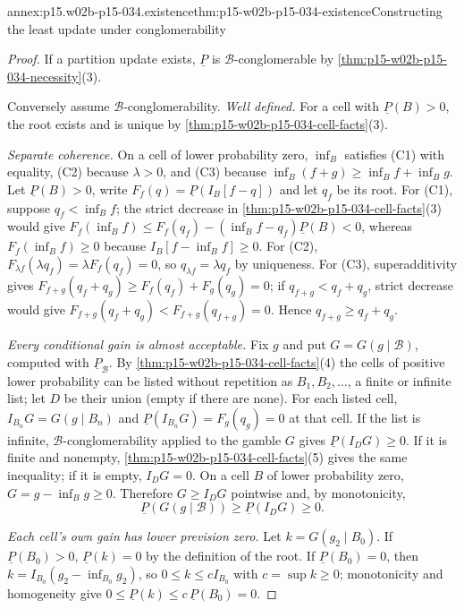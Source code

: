 \begin{annexitem}{annex:p15.w02b-p15-034.existence}{thm:p15-w02b-p15-034-existence}{Constructing the least update under conglomerability}
\begin{proof}
If a partition update exists, \(\underline P\) is
\(\mathcal B\)-conglomerable by
\cref{thm:p15-w02b-p15-034-necessity}(3).

Conversely assume \(\mathcal B\)-conglomerability.
\emph{Well defined.} For a cell with \(\underline P(B)>0\), the root
exists and is unique by \cref{thm:p15-w02b-p15-034-cell-facts}(3).

\emph{Separate coherence.} On a cell of lower probability zero,
\(\inf_B\) satisfies (C1) with equality, (C2) because \(\lambda>0\), and
(C3) because \(\inf_B(f+g)\geq\inf_Bf+\inf_Bg\). Let
\(\underline P(B)>0\), write \(F_f(q)=\underline P(I_B[f-q])\) and let
\(q_f\) be its root. For (C1), suppose \(q_f<\inf_Bf\); the strict
decrease in \cref{thm:p15-w02b-p15-034-cell-facts}(3) would give
\(F_f(\inf_Bf)\leq F_f(q_f)-(\inf_Bf-q_f)\underline P(B)<0\), whereas
\(F_f(\inf_Bf)\geq0\) because \(I_B[f-\inf_Bf]\geq0\). For (C2),
\(F_{\lambda f}(\lambda q_f)=\lambda F_f(q_f)=0\), so
\(q_{\lambda f}=\lambda q_f\) by uniqueness. For (C3), superadditivity gives
\(F_{f+g}(q_f+q_g)\geq F_f(q_f)+F_g(q_g)=0\); if \(q_{f+g}<q_f+q_g\),
strict decrease would give \(F_{f+g}(q_f+q_g)<F_{f+g}(q_{f+g})=0\). Hence
\(q_{f+g}\geq q_f+q_g\).

\emph{Every conditional gain is almost acceptable.} Fix \(g\) and put
\(G=G(g\mid\mathcal B)\), computed with \(\underline P_{\mathcal B}\). By
\cref{thm:p15-w02b-p15-034-cell-facts}(4) the cells of positive lower
probability can be listed without repetition as \(B_1,B_2,\ldots\), a finite
or infinite list; let \(D\) be their union (empty if there are none). For
each listed cell, \(I_{B_n}G=G(g\mid B_n)\) and
\(\underline P(I_{B_n}G)=F_g(q_g)=0\) at that cell. If the list is
infinite, \(\mathcal B\)-conglomerability applied to the gamble \(G\) gives
\(\underline P(I_DG)\geq0\). If it is finite and nonempty,
\cref{thm:p15-w02b-p15-034-cell-facts}(5) gives the same inequality; if it
is empty, \(I_DG=0\). On a cell \(B\) of lower probability zero,
\(G=g-\inf_Bg\geq0\). Therefore \(G\geq I_DG\) pointwise and, by
monotonicity,
\[
                  \underline P(G(g\mid\mathcal B))\geq\underline P(I_DG)\geq0.
\]

\emph{Each cell's own gain has lower prevision zero.} Let
\(k=G(g_2\mid B_0)\). If \(\underline P(B_0)>0\),
\(\underline P(k)=0\) by the definition of the root. If
\(\underline P(B_0)=0\), then \(k=I_{B_0}(g_2-\inf_{B_0}g_2)\), so
\(0\leq k\leq cI_{B_0}\) with \(c=\sup k\geq0\); monotonicity and
homogeneity give \(0\leq\underline P(k)\leq c\,\underline P(B_0)=0\).


\end{proof}
\end{annexitem}
